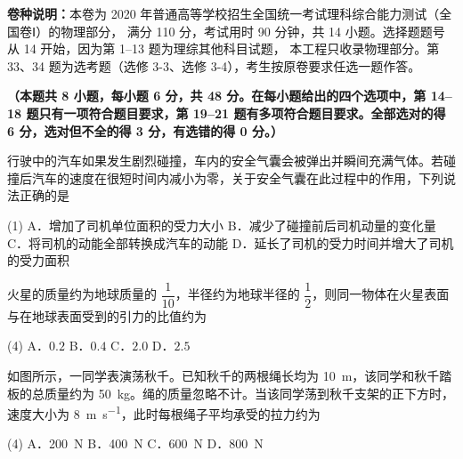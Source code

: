 
\begin{gknotice}
  \textbf{卷种说明：}本卷为 2020 年普通高等学校招生全国统一考试理科综合能力测试（全国卷Ⅰ）的物理部分，
  满分 110 分，考试用时 90 分钟，共 14 小题。选择题题号从 14 开始，因为第 1--13 题为理综其他科目试题，
  本工程只收录物理部分。第 33、34 题为选考题（选修 3-3、选修 3-4），考生按原卷要求任选一题作答。
\end{gknotice}


\textbf{（本题共 8 小题，每小题 6 分，共 48 分。在每小题给出的四个选项中，第 14--18 题只有一项符合题目要求，第 19--21 题有多项符合题目要求。全部选对的得 6 分，选对但不全的得 3 分，有选错的得 0 分。）}

\begin{question}
行驶中的汽车如果发生剧烈碰撞，车内的安全气囊会被弹出并瞬间充满气体。若碰撞后汽车的速度在很短时间内减小为零，关于安全气囊在此过程中的作用，下列说法正确的是\gkblank

\begin{gkopts}(1)
  \task A．增加了司机单位面积的受力大小
  \task B．减少了碰撞前后司机动量的变化量
  \task C．将司机的动能全部转换成汽车的动能
  \task D．延长了司机的受力时间并增大了司机的受力面积
\end{gkopts}
\end{question}

\begin{question}
火星的质量约为地球质量的 $\dfrac{1}{10}$，半径约为地球半径的 $\dfrac{1}{2}$，则同一物体在火星表面与在地球表面受到的引力的比值约为\gkblank

\begin{gkopts}(4)
  \task A．$0.2$
  \task B．$0.4$
  \task C．$2.0$
  \task D．$2.5$
\end{gkopts}
\end{question}

\begin{question}
如图所示，一同学表演荡秋千。已知秋千的两根绳长均为 \SI{10}{\metre}，该同学和秋千踏板的总质量约为 \SI{50}{\kilogram}。绳的质量忽略不计。当该同学荡到秋千支架的正下方时，速度大小为 \SI{8}{\metre\per\second}，此时每根绳子平均承受的拉力约为\gkblank


\begin{gkopts}(4)
  \task A．\SI{200}{\newton}
  \task B．\SI{400}{\newton}
  \task C．\SI{600}{\newton}
  \task D．\SI{800}{\newton}
\end{gkopts}
\end{question}

